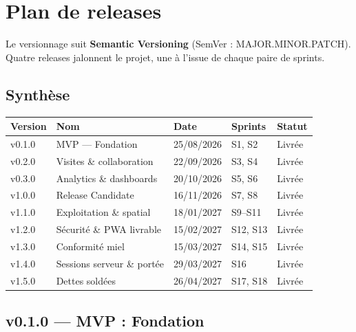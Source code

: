 \chapter{Plan de releases}
\label{chap:releases}

Le versionnage suit \textbf{Semantic Versioning} (SemVer :
MAJOR.MINOR.PATCH). Quatre releases jalonnent le projet, une à l'issue de
chaque paire de sprints.

\section{Synthèse}

\begin{center}
\begin{tabular}{lllll}
\toprule
\textbf{Version} & \textbf{Nom} & \textbf{Date} & \textbf{Sprints} & \textbf{Statut} \\
\midrule
v0.1.0 & MVP --- Fondation          & 25/08/2026 & S1, S2 & Livrée \\
v0.2.0 & Visites \& collaboration   & 22/09/2026 & S3, S4 & Livrée \\
v0.3.0 & Analytics \& dashboards    & 20/10/2026 & S5, S6 & Livrée \\
v1.0.0 & Release Candidate          & 16/11/2026 & S7, S8 & Livrée\footnotemark \\
v1.1.0 & Exploitation \& spatial    & 18/01/2027 & S9--S11 & Livrée \\
v1.2.0 & Sécurité \& PWA livrable   & 15/02/2027 & S12, S13 & Livrée \\
v1.3.0 & Conformité miel            & 15/03/2027 & S14, S15 & Livrée \\
v1.4.0 & Sessions serveur \& portée & 29/03/2027 & S16 & Livrée \\
v1.5.0 & Dettes soldées             & 26/04/2027 & S17, S18 & Livrée \\
\bottomrule
\end{tabular}
\end{center}

\section{v0.1.0 --- MVP : Fondation}

